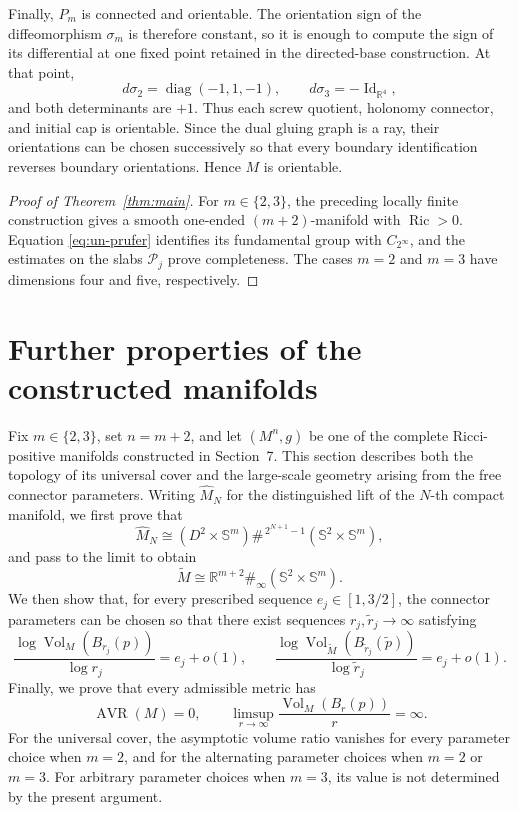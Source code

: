 \documentclass[11pt,reqno]{amsart}
\theoremstyle{definition}
\numberwithin{equation}{section}
\DeclareMathOperator{\Ric}{Ric}
\newcommand{\CPrufer}{C_{2^\infty}}
\begin{document}
Finally, \(P_m\) is connected and orientable.  The orientation sign of
the diffeomorphism \(\sigma_m\) is therefore constant, so it is enough
to compute the sign of its differential at one fixed point retained in
the directed-base construction.  At that point,
\[
 d\sigma_2=\operatorname{diag}(-1,1,-1),
 \qquad d\sigma_3=-\operatorname{Id}_{\mathbb R^4},
\]
and both determinants are \(+1\).  Thus each screw quotient, holonomy
connector, and initial cap is orientable.  Since the dual gluing graph is
a ray, their
orientations can be chosen successively so that every boundary
identification reverses boundary orientations.  Hence \(M\) is
orientable.

\begin{proof}[Proof of Theorem~\ref{thm:main}]
For \(m\in\{2,3\}\), the preceding locally finite construction gives a
smooth one-ended \((m+2)\)-manifold with \(\Ric>0\).  Equation
\eqref{eq:un-prufer} identifies its fundamental group with \(\CPrufer\),
and the estimates on the slabs $\mathcal P_j$ prove completeness.  The
cases \(m=2\)
and \(m=3\) have dimensions four and five, respectively.
\end{proof}


\section{Further properties of the constructed manifolds}
\label{sec:further-properties}

Fix \(m\in\{2,3\}\), set \(n=m+2\), and let
\((M^n,g)\) be one of the complete Ricci-positive manifolds constructed
in Section~7.  This section describes both the topology of its
universal cover and the large-scale geometry arising from the free
connector parameters.  Writing \(\widehat M_N\) for the distinguished
lift of the \(N\)-th compact manifold, we first prove that
\[
 \widehat M_N
 \cong
 (D^2\times\mathbb S^m)
 \#^{\,2^{N+1}-1}
 (\mathbb S^2\times\mathbb S^m),
\]
and pass to the limit to obtain
\[
 \widetilde M
 \cong
 \mathbb R^{m+2}\#_{\infty}
 (\mathbb S^2\times\mathbb S^m).
\]
We then show that, for every prescribed sequence
\(e_j\in[1,3/2]\), the connector parameters can be chosen so that
there exist sequences \(r_j,\widetilde r_j\to\infty\) satisfying
\[
 \frac{\log\operatorname{Vol}_M(B_{r_j}(p))}{\log r_j}
 =e_j+o(1),
 \qquad
 \frac{\log\operatorname{Vol}_{\widetilde M}
 (B_{\widetilde r_j}(\widetilde p))}
 {\log\widetilde r_j}
 =e_j+o(1).
\]
Finally, we prove that every admissible metric has
\[
 \operatorname{AVR}(M)=0,
 \qquad
 \limsup_{r\to\infty}
 \frac{\operatorname{Vol}_M(B_r(p))}{r}
 =\infty.
\]
For the universal cover, the asymptotic volume ratio vanishes for every
parameter choice when \(m=2\), and for the alternating parameter
choices when \(m=2\) or \(m=3\).  For arbitrary parameter choices when
\(m=3\), its value is not determined by the present argument.
\end{document}
